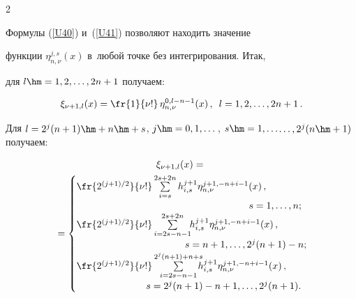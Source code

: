 \begin{multicols}{2}
\vspace*{2pt}





Формулы (\ref{U40}) и~(\ref{U41}) позволяют находить значение 


функции $\eta_{n,\nu}^{j,s}(x)$ в~любой точке без интегрирования. Итак, 


для $l\hm=1,2,\dots, 2n+1$ получаем:





\columnbreak





\noindent


$$


{\xi}_{\nu+1,l}(x)=\fr{1}{\nu !}\, \eta_{n,\nu}^{0,l-n-1}(x)\,,\enskip


l=1,2,\dots, 2n+1\,.


$$


Для $l=2^j(n+1)\hm+n\hm+s$, $j\hm=0,1,\dots$, $s\hm=1,\ldots$\linebreak$\ldots,2^{j}(n\hm+1)$ получаем:


\begin{multline*}


{\xi}_{\nu+1,l}(x)={}\\


{}=


\begin{cases}


\fr{2^{({j+1})/{2}}}{\nu !}\sum\limits_{i=s}^{2s+2n}


h_{i,s}^{j+1}\eta_{n,\nu}^{j+1,-n+i-1}(x)\,, &\\


& \hspace*{-17mm}s=1,\ldots,n; \\


\fr{2^{({j+1})/{2}}}{\nu !}\sum\limits_{i=2s-n-1}^{2s+2n}


\!\! h_{i,s}^{j+1}\eta_{n,\nu}^{j+1,-n+i-1}(x)\,, &\\


& \hspace*{-40mm}s=n+1,\ldots,2^{j}(n+1)-n;\\


\fr{2^{({j+1})/{2}}}{\nu !}\sum\limits_{i=2s-n-1}^{2^{j}(n+1)+n+s}\!\!\!\!


h_{i,s}^{j+1}\eta_{n,\nu}^{j+1,-n+i-1}(x)\,, &\\


& \hspace*{-54mm}s=2^{j}(n+1)-n+1,\ldots,2^{j}(n+1).



\end{cases}
\end{multline*}
\end{multicols}
